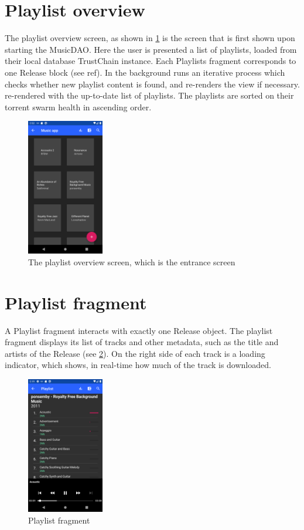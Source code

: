 \section{Playlist overview}
The playlist overview screen, as shown in \ref{fig:screenshot-home} is the screen that is first shown upon starting the MusicDAO. Here the user is presented a list of playlists, loaded from their local database TrustChain instance. Each Playlists fragment corresponds to one Release block (see ref). In the background runs an iterative process which checks whether new playlist content is found, and re-renders the view if necessary.  re-rendered with the up-to-date list of playlists. The playlists are sorted on their torrent swarm health in ascending order. 
\begin{figure}
    \centering
    \includegraphics[width=0.3\textwidth]{implementation/screenshot-home.png}
    \caption{The playlist overview screen, which is the entrance screen}
    \label{fig:screenshot-home}
\end{figure}
\section{Playlist fragment}
A Playlist fragment interacts with exactly one Release object. The playlist fragment displays its list of tracks and other metadata, such as the title and artists of the Release (see \ref{fig:screenshot-playlist}). On the right side of each track is a loading indicator, which shows, in real-time how much of the track is downloaded.
\begin{figure}
    \centering
    \includegraphics[width=0.3\textwidth]{implementation/screenshot-playlist.png}
    \caption{Playlist fragment}
    \label{fig:screenshot-playlist}
\end{figure}
